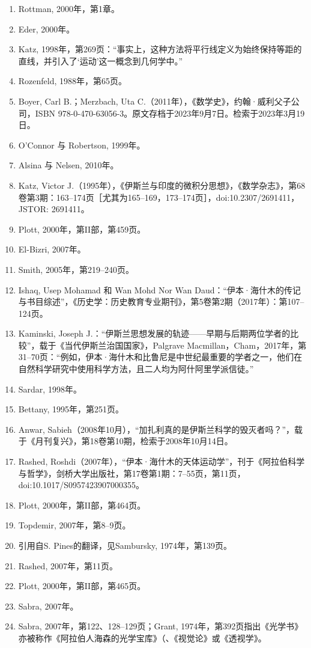 \begin{enumerate}
\item Rottman, 2000年，第1章。
\item Eder, 2000年。
\item Katz, 1998年，第269页：“事实上，这种方法将平行线定义为始终保持等距的直线，并引入了‘运动’这一概念到几何学中。”
\item Rozenfeld, 1988年，第65页。
\item Boyer, Carl B.；Merzbach, Uta C.（2011年），《数学史》，约翰·威利父子公司，ISBN 978-0-470-63056-3。原文存档于2023年9月7日。检索于2023年3月19日。
\item O'Connor 与 Robertson, 1999年。
\item Alsina 与 Nelsen, 2010年。
\item Katz, Victor J.（1995年），《伊斯兰与印度的微积分思想》，《数学杂志》，第68卷第3期：163–174页［尤其为165–169，173–174页］，doi:10.2307/2691411，JSTOR: 2691411。
\item Plott, 2000年，第II部，第459页。
\item El-Bizri, 2007年。
\item Smith, 2005年，第219–240页。
\item Ishaq, Usep Mohamad 和 Wan Mohd Nor Wan Daud：“伊本·海什木的传记与书目综述”，《历史学：历史教育专业期刊》，第5卷第2期（2017年）：第107–124页。
\item Kaminski, Joseph J.：“伊斯兰思想发展的轨迹——早期与后期两位学者的比较”，载于《当代伊斯兰治国国家》，Palgrave Macmillan，Cham，2017年，第31–70页：“例如，伊本·海什木和比鲁尼是中世纪最重要的学者之一，他们在自然科学研究中使用科学方法，且二人均为阿什阿里学派信徒。”
\item Sardar, 1998年。
\item Bettany, 1995年，第251页。
\item Anwar, Sabieh（2008年10月），“加扎利真的是伊斯兰科学的毁灭者吗？”，载于《月刊复兴》，第18卷第10期，检索于2008年10月14日。
\item Rashed, Roshdi（2007年），“伊本·海什木的天体运动学”，刊于《阿拉伯科学与哲学》，剑桥大学出版社，第17卷第1期：7–55页，第11页，doi:10.1017/S0957423907000355。
\item Plott, 2000年，第II部，第464页。
\item Topdemir, 2007年，第8–9页。
\item 引用自S. Pines的翻译，见Sambursky, 1974年，第139页。
\item Rashed, 2007年，第11页。
\item Plott, 2000年，第II部，第465页。
\item Sabra, 2007年。
\item Sabra, 2007年，第122、128–129页；Grant, 1974年，第392页指出《光学书》亦被称作《阿拉伯人海森的光学宝库》（、《视觉论》或《透视学》。

\end{enumerate}
